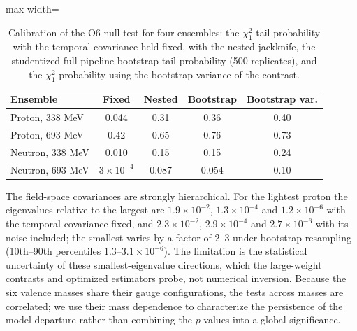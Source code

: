 \documentclass[aps,prd,reprint,twocolumn,superscriptaddress,nofootinbib,longbibliography]{revtex4-2}
\begin{document}
\begin{table}[t]
\caption{Calibration of the O6 null test for four ensembles: the $\chi^2_1$ tail probability with the temporal covariance held fixed, with the nested jackknife, the studentized full-pipeline bootstrap tail probability (500 replicates), and the $\chi^2_1$ probability using the bootstrap variance of the contrast.}
\label{tab:bootcal}
\centering
\begin{adjustbox}{max width=\columnwidth}
\setlength{\tabcolsep}{5pt}\begin{tabular}{lcccc}
\toprule
Ensemble & Fixed & Nested & Bootstrap & Bootstrap var.\\
\midrule
Proton, 338 MeV & 0.044 & 0.31 & 0.36 & 0.40\\
Proton, 693 MeV & 0.42 & 0.65 & 0.76 & 0.73\\
Neutron, 338 MeV & 0.010 & 0.15 & 0.15 & 0.24\\
Neutron, 693 MeV & $3\times10^{-4}$ & 0.087 & 0.054 & 0.10\\
\bottomrule
\end{tabular}
\end{adjustbox}
\end{table}

The field-space covariances are strongly hierarchical. For the lightest proton the eigenvalues relative to the largest are $1.9\times10^{-2}$, $1.3\times10^{-4}$ and $1.2\times10^{-6}$ with the temporal covariance fixed, and $2.3\times10^{-2}$, $2.9\times10^{-4}$ and $2.7\times10^{-6}$ with its noise included; the smallest varies by a factor of 2--3 under bootstrap resampling (10th--90th percentiles $1.3$--$3.1\times10^{-6}$). The limitation is the statistical uncertainty of these smallest-eigenvalue directions, which the large-weight contrasts and optimized estimators probe, not numerical inversion. Because the six valence masses share their gauge configurations, the tests across masses are correlated; we use their mass dependence to characterize the persistence of the model departure rather than combining the $p$ values into a global significance.
\end{document}
